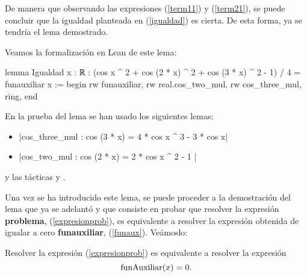 \begin{demostracion}
De manera que observando las expresiones (\ref{term11}) y
(\ref{term21}), se puede concluir que la igualdad planteada en
(\ref{igualdad}) es cierta.  De esta forma, ya se tendría el lema
demostrado.
\end{demostracion}

Veamos la formalización en Lean de este lema:
\begin{leancode}
lemma Igualdad {x : ℝ} :
  (cos x ^ 2 + cos (2 * x) ^ 2 + cos (3 * x) ^ 2 - 1) / 4 = funauxiliar x :=
begin
  rw funauxiliar,
  rw real.cos_two_mul,
  rw cos_three_mul,
  ring,
end
\end{leancode}

En la prueba del lema se han usado los siguientes lemas:
\begin{itemize}
\item {}|cos_three_mul : cos (3 * x) = 4 * cos x ^ 3 - 3 * cos x|
\item {}|cos_two_mul : cos (2 * x) = 2 * cos x ^ 2 - 1 |
\end{itemize}
y las tácticas
 y
.

Una vez se ha introducido este lema, se puede proceder a la demostración
del lema que ya se adelantó y que consiste en probar que resolver la
expresión \textbf{problema}, (\ref{expresionprob}), es equivalente a
resolver la expresión obtenida de igualar a cero \textbf{funauxiliar},
(\ref{funaux}). Veámoslo:

\begin{lema}[Equivalencia]\label{lemaequivalenciaprob}
  Resolver la expresión (\ref{expresionprob}) es equivalente a resolver
  la expresión
  \begin{equation}\label{probaux}
    \mbox{\rm funAuxiliar}(x) = 0.
  \end{equation}
\end{lema}


